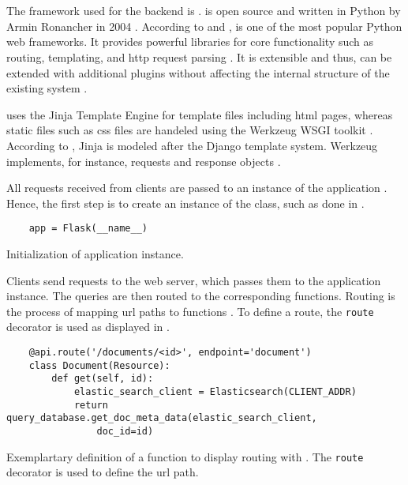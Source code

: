 \section{\flask{}}\label{sec:BE_flask}

The framework used for the backend is \flask{}.
\flask{} is open source and written in Python by Armin Ronancher in 2004 \cite{flask2015, mvc_flask2019}.
According to \citeauthor{flask_book2015} and \citeauthor{mvc_flask2019}, \flask{} is one of the most popular Python web frameworks.
It provides powerful libraries for core functionality such as routing, templating, and \ac{http} request parsing \cite{flask_book2015}.
It is extensible and thus, can be extended with additional plugins without affecting the internal structure of the existing system \cite{flask2015}.

\flask{} uses the Jinja Template Engine for template files including \ac{html} pages,
whereas static files such as \ac{css} files are handeled using the Werkzeug WSGI toolkit \cite{flask2015}.
According to \citeauthor{flask2015}, Jinja is modeled after the Django template system.
Werkzeug implements, for instance, requests and response objects \cite{mvc_flask2019}.

All requests received from clients are passed to an instance of the \flask{} application \cite{flask_book2018}.
Hence, the first step is to create an instance of the \flask{} class, such as done in .

\begin{listing}[htp]
    \begin{verbatim}
    app = Flask(__name__)
    \end{verbatim}
    \caption{Initialization of \flask{} application instance.
    }
    \label{lst:flask_app_init}
\end{listing}

Clients send requests to the web server, which passes them to the \flask{} application instance.
The queries are then routed to the corresponding functions.
Routing is the process of mapping \ac{url} paths to functions \cite{flask_book2018}.
To define a route, the \texttt{route} decorator is used as displayed in .

\begin{listing}[htp]
    \begin{verbatim}
    @api.route('/documents/<id>', endpoint='document')
    class Document(Resource):
        def get(self, id):
            elastic_search_client = Elasticsearch(CLIENT_ADDR)
            return query_database.get_doc_meta_data(elastic_search_client, 
                doc_id=id)
    \end{verbatim}
    \caption{Exemplartary definition of a function to display routing with \flask{}.
    The \texttt{route} decorator is used to define the \ac{url} path.
    }
    \label{lst:flask_routing}
\end{listing}

